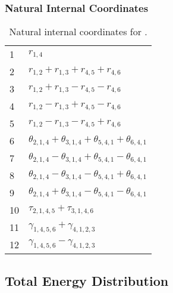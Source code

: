 \documentclass[10pt,oneside]{article}
\begin{document}
\begin{table}[h!]
\subsubsection*{Natural Internal Coordinates}
\centering
\caption{Natural internal coordinates for .}
\small
\begin{tabular}{ll}
\toprule
  1   & $r_{1,4}$ \\
  2   & $r_{1,2} + r_{1,3} + r_{4,5} + r_{4,6}$ \\
  3   & $r_{1,2} + r_{1,3} - r_{4,5} - r_{4,6}$ \\
  4   & $r_{1,2} - r_{1,3} + r_{4,5} - r_{4,6}$ \\
  5   & $r_{1,2} - r_{1,3} - r_{4,5} + r_{4,6}$ \\
  6   & $\theta_{2,1,4} + \theta_{3,1,4} + \theta_{5,4,1} + \theta_{6,4,1}$ \\
  7   & $\theta_{2,1,4} - \theta_{3,1,4} + \theta_{5,4,1} - \theta_{6,4,1}$ \\
  8   & $\theta_{2,1,4} - \theta_{3,1,4} - \theta_{5,4,1} + \theta_{6,4,1}$ \\
  9   & $\theta_{2,1,4} + \theta_{3,1,4} - \theta_{5,4,1} - \theta_{6,4,1}$ \\
  10  & $\tau_{2,1,4,5} + \tau_{3,1,4,6}$ \\
  11  & $\gamma_{1,4,5,6} + \gamma_{4,1,2,3}$ \\
  12  & $\gamma_{1,4,5,6} - \gamma_{4,1,2,3}$ \\
\bottomrule
\end{tabular}
\end{table}

\begin{table}
\subsection*{Total Energy Distribution}
\centering\end{table}

\clearpage

\subsection{}
\end{document}
